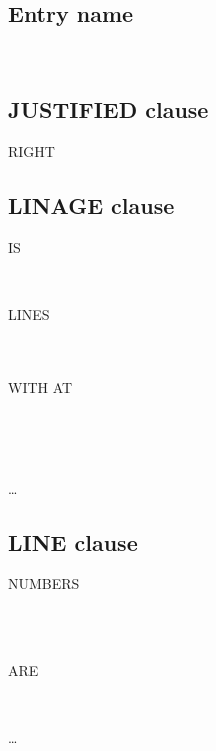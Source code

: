 \subsection{Entry name}
\begin{0-1}
   \\
  \identifier
\end{0-1}

\subsection{JUSTIFIED clause}
 RIGHT

\subsection{LINAGE clause}
 IS
\begin{1=}
  \identifier \\
  \literal
\end{1=}
LINES
\begin{0-1}
  \begin{1=}
     \\
     \\
    WITH  AT
  \end{1=}
  \begin{1=}
    \identifier \\
    \literal
  \end{1=} \\
\end{0-1}
\ldots \\

\subsection{LINE clause}

\begin{1=}
   NUMBERS
  \begin{0-1}
     \\
  \end{0-1} \\

   ARE
\end{1=}
\begin{1=}
  \begin{0-1}
  \end{0-1}
  \integer \\
   
\end{1=}\ldots

